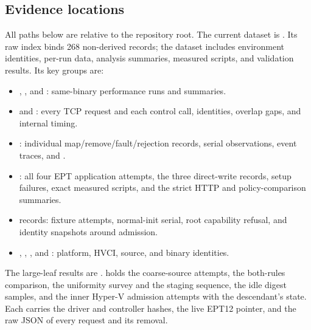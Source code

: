 \subsection{Evidence locations}
All paths below are relative to the repository root. The current dataset is
. Its raw index binds 268
non-derived records; the dataset includes environment identities, per-run data,
analysis summaries, measured scripts, and validation results. Its key groups are:
\begin{itemize}
\item {}, , and
      : same-binary performance runs and summaries.
\item {} and : every TCP request and each
      control call, identities, overlap gaps, and internal timing.
\item {}: individual map/remove/fault/rejection records, serial
      observations, event traces, and .
\item {}: all four EPT application attempts, the three
      direct-write records, setup failures, exact measured scripts, and the
      strict HTTP and policy-comparison summaries.
\item {} records: fixture attempts, normal-init serial, root
      capability refusal, and identity snapshots around admission.
\item {}, ,
      , and : platform,
      HVCI, source, and binary identities.
\end{itemize}

The large-leaf results are .
 holds the coarse-source attempts,
 the both-rules comparison,
 the uniformity survey and the staging sequence,
 the idle digest samples, and 
the inner Hyper-V admission attempts with the descendant's state. Each carries
the driver and controller hashes, the live EPT12 pointer, and the raw JSON of
every request and its removal.

